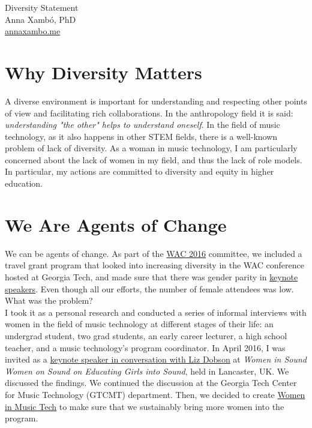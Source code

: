 \documentclass[10pt, a4paper]{article}
\begin{document}
{\LARGE Diversity Statement}\\[0.2cm]
Anna Xambó, PhD\\
\href{http://annaxambo.me}{annaxambo.me}

\section*{Why Diversity Matters}

A diverse environment is important for understanding and respecting other points of view and facilitating rich collaborations. In the anthropology field it is said: \emph{understanding "the other" helps to understand oneself}. In the field of music technology, as it also happens in other STEM fields, there is a well-known problem of lack of diversity. As a woman in music technology, I am particularly concerned about the lack of women in my field, and thus the lack of role models. In particular, my actions are committed to diversity and equity in higher education.

\section*{We Are Agents of Change}

We can be agents of change. As part of the \href{http://webaudio.gatech.edu/}{WAC 2016} committee, we included a travel grant program that looked into increasing diversity in the WAC conference hosted at Georgia Tech, and made sure that there was gender parity in \href{http://webaudio.gatech.edu/keynotes}{keynote speakers}. Even though all our efforts, the number of female attendees was low. What was the problem?\\

I took it as a personal research and conducted a series of informal interviews with women in the field of music technology at different stages of their life: an undergrad student, two grad students, an early career lecturer, a high school teacher, and a music technology's program coordinator. In April 2016, I was invited as a \href{http://wiswos.bitbucket.org/index.html\%3Fp=435.html}{keynote speaker in conversation with Liz Dobson} at \emph{Women in Sound Women on Sound on Educating Girls into Sound}, held in Lancaster, UK. We discussed the findings. We continued the discussion at the Georgia Tech Center for Music Technology (GTCMT) department. Then, we decided to create \href{http://www.gtcmt.gatech.edu/}{Women in Music Tech} to make sure that we sustainably bring more women into the program.
\end{document}
